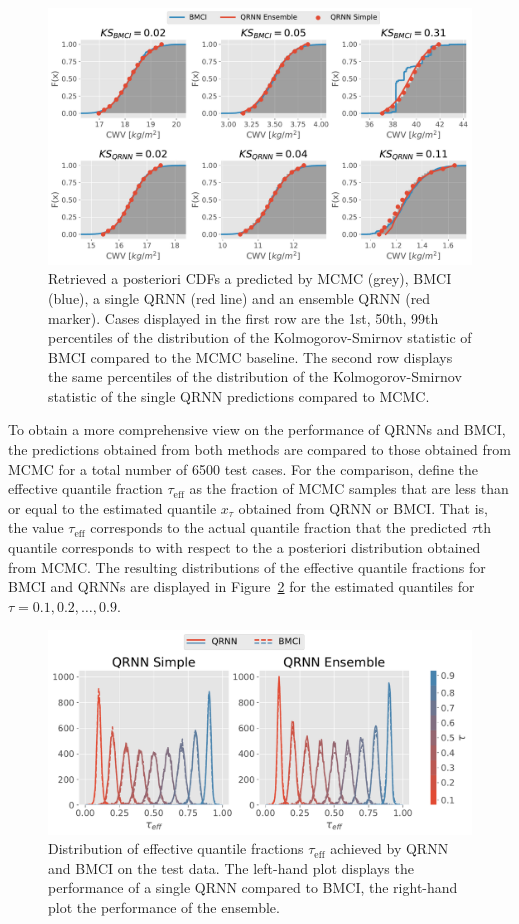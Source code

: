 \documentclass[journal abbreviation, manuscript]{copernicus}
\begin{document}
  \begin{figure}[hbpt!]
    \centering
    \includegraphics[width = 0.8\linewidth]{../plots/posterior_cdfs}
    \caption{Retrieved a posteriori CDFs a predicted by MCMC (grey), BMCI (blue),
      a single QRNN (red line) and an ensemble QRNN (red marker). Cases displayed in the first
      row are the 1st, 50th, 99th percentiles of the distribution of the Kolmogorov-Smirnov
      statistic of BMCI compared to the MCMC baseline. The second row displays the
      same percentiles of the distribution of the Kolmogorov-Smirnov statistic of the
      single QRNN predictions compared to MCMC.}
    \label{fig:cdfs}
  \end{figure}

  To obtain a more comprehensive view on the performance of QRNNs and BMCI, the
  predictions obtained from both methods are compared to those obtained from
  MCMC for a total number of 6500 test cases. For the comparison, define the
  effective quantile fraction $\tau_{\text{eff}}$ as the fraction of MCMC
  samples that are less than or equal to the estimated quantile $x_\tau$
  obtained from QRNN or BMCI. That is, the value $\tau_\text{eff}$ corresponds
  to the actual quantile fraction that the predicted $\tau$th quantile
  corresponds to with respect to the a posteriori distribution obtained from
  MCMC. The resulting distributions of the effective quantile fractions for BMCI
  and QRNNs are displayed in Figure~\ref{fig:quantile_fractions} for the
  estimated quantiles for $\tau = 0.1, 0.2, \ldots, 0.9$.

  \begin{figure}[hbpt!]
    \centering
    \includegraphics[width = 0.8\linewidth]{../plots/quantile_fractions}
    \caption{Distribution of effective quantile fractions $\tau_\text{eff}$ achieved by
      QRNN and BMCI on the test data. The left-hand plot displays the performance of a
      single QRNN compared to BMCI, the right-hand plot the performance of the ensemble.}
    \label{fig:quantile_fractions}
  \end{figure}
\end{document}
